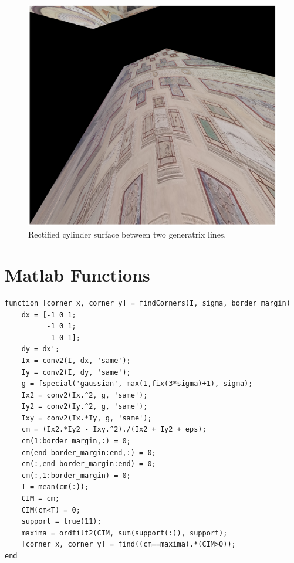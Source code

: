 \documentclass[12pt,a4paper]{article}
\begin{document}
\begin{figure}[H]
    \centering
    \includegraphics[width=1\textwidth]{Images/PalazzoTe_rectified.png}
    \caption[Rectified cylinder surface between two generatrix lines.]{Rectified cylinder surface between two generatrix lines.}
    \label{fig:rectified}
\end{figure}

\pagebreak

\normalsize

\section*{Matlab Functions}

\begin{verbatim}
function [corner_x, corner_y] = findCorners(I, sigma, border_margin)
    dx = [-1 0 1; 
          -1 0 1; 
          -1 0 1];
    dy = dx';
    Ix = conv2(I, dx, 'same');
    Iy = conv2(I, dy, 'same');
    g = fspecial('gaussian', max(1,fix(3*sigma)+1), sigma);
    Ix2 = conv2(Ix.^2, g, 'same');
    Iy2 = conv2(Iy.^2, g, 'same');
    Ixy = conv2(Ix.*Iy, g, 'same');
    cm = (Ix2.*Iy2 - Ixy.^2)./(Ix2 + Iy2 + eps);
    cm(1:border_margin,:) = 0;
    cm(end-border_margin:end,:) = 0;
    cm(:,end-border_margin:end) = 0;
    cm(:,1:border_margin) = 0;
    T = mean(cm(:));
    CIM = cm;
    CIM(cm<T) = 0;
    support = true(11);
    maxima = ordfilt2(CIM, sum(support(:)), support);
    [corner_x, corner_y] = find((cm==maxima).*(CIM>0));
end
\end{verbatim}
\end{document}
